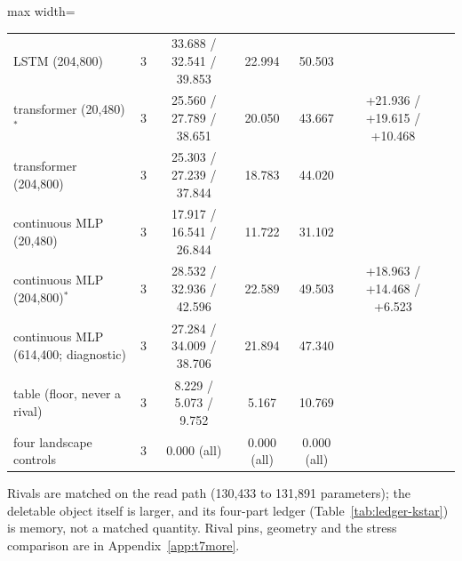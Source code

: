 \documentclass{article} %
\begin{document}
\begin{table}[t]
\begin{adjustbox}{max width=\linewidth}
\begin{tabular}{lcccccc}
LSTM (204,800) & 3 & 33.688 / 32.541 / 39.853 & 22.994 & 50.503 & & \\
transformer (20,480)$^\ast$ & 3 & 25.560 / 27.789 / 38.651 & 20.050 & 43.667 & +21.936 / +19.615 / +10.468 & \\
transformer (204,800) & 3 & 25.303 / 27.239 / 37.844 & 18.783 & 44.020 & & \\
continuous MLP (20,480) & 3 & 17.917 / 16.541 / 26.844 & 11.722 & 31.102 & & \\
continuous MLP (204,800)$^\ast$ & 3 & 28.532 / 32.936 / 42.596 & 22.589 & 49.503 & +18.963 / +14.468 / +6.523 & \\
continuous MLP (614,400; diagnostic) & 3 & 27.284 / 34.009 / 38.706 & 21.894 & 47.340 & & \\
table (floor, never a rival) & 3 & 8.229 / 5.073 / 9.752 & 5.167 & 10.769 & & \\
\midrule
four landscape controls & 3 & 0.000 (all) & 0.000 (all) & 0.000 (all) & & \\
\bottomrule
\end{tabular}\end{adjustbox}
\end{table}


\noindent Rivals are matched on the read path (130,433 to 131,891 parameters); the deletable object
itself is larger, and its four-part ledger (Table~\ref{tab:ledger-kstar}) is memory, not a matched
quantity. Rival pins, geometry and the stress comparison are in Appendix~\ref{app:t7more}.
\end{document}

